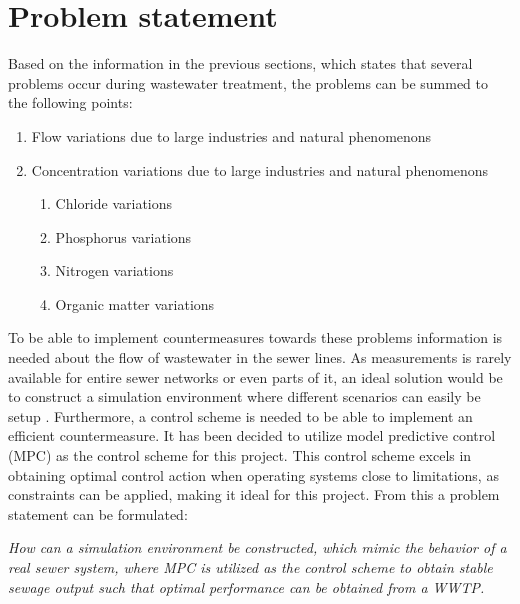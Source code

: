 \newpage
\section{Problem statement}\label{sec:problem_statement}

Based on the information in the previous sections, which states that several problems occur during wastewater treatment, the problems can be summed to the following points:

\begin{enumerate}
\item Flow variations due to large industries and natural phenomenons
\item Concentration variations due to large industries and natural phenomenons
\begin{enumerate}
	\item Chloride variations
	\item Phosphorus variations
	\item Nitrogen variations
	\item Organic matter variations
\end{enumerate}
\end{enumerate}

To be able to implement countermeasures towards these problems information is needed about the flow of wastewater in the sewer lines. As measurements is rarely available for entire sewer networks or even parts of it, an ideal solution would be to construct a simulation environment where different scenarios can easily be setup \cite{fredericia_spildevand_mode}. Furthermore, a control scheme is needed to be able to implement an efficient countermeasure. It has been decided to utilize model predictive control (MPC) as the control scheme for this project. This control scheme excels in obtaining optimal control action when operating systems close to limitations, as constraints can be applied, making it ideal for this project.
From this a problem statement can be formulated: \\
\begin{center}
\textit{How can a simulation environment be constructed, which mimic the behavior of a real sewer system, where MPC is utilized as the control scheme to obtain stable sewage output such that optimal performance can be obtained from a WWTP.}
\end{center}